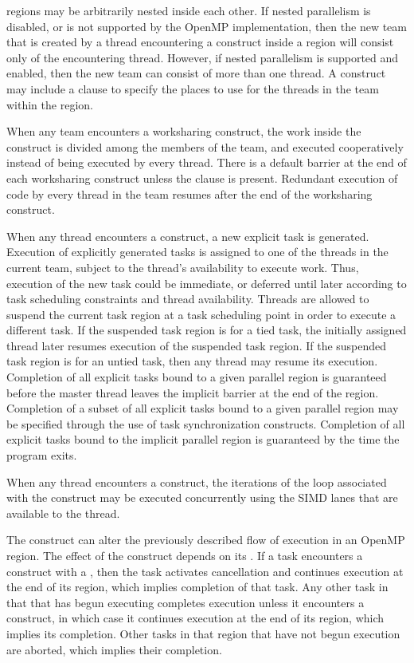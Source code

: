  regions may be arbitrarily nested inside each other. If nested parallelism is
disabled, or is not supported by the OpenMP implementation, then the new team that is 
created by a thread encountering a  construct inside a  region
will consist only of the encountering thread. However, if nested parallelism is supported 
and enabled, then the new team can consist of more than one thread. A 
construct may include a  clause to specify the places to use for the threads
in the team within the  region.

When any team encounters a worksharing construct, the work inside the construct is 
divided among the members of the team, and executed cooperatively instead of being 
executed by every thread. There is a default barrier at the end of each worksharing 
construct unless the  clause is present. Redundant execution of code by every
thread in the team resumes after the end of the worksharing construct.

When any thread encounters a  construct, a new explicit task is generated.
Execution of explicitly generated tasks is assigned to one of the threads in the current 
team, subject to the thread's availability to execute work. Thus, execution of the new 
task could be immediate, or deferred until later according to task scheduling constraints 
and thread availability. Threads are allowed to suspend the current task region at a task 
scheduling point in order to execute a different task. If the suspended task region is for
a tied task, the initially assigned thread later resumes execution of the suspended task
region. If the suspended task region is for an untied task, then any thread may resume its
execution. Completion of all explicit tasks bound to a given parallel region is guaranteed
before the master thread leaves the implicit barrier at the end of the region. Completion
of a subset of all explicit tasks bound to a given parallel region may be specified through
the use of task synchronization constructs. Completion of all explicit tasks bound to the
implicit parallel region is guaranteed by the time the program exits.

When any thread encounters a  construct, the iterations of the loop associated with
the construct may be executed concurrently using the SIMD lanes that are available to
the thread.

The  construct can alter the previously described flow of execution in an
OpenMP region. The effect of the  construct depends on its 
. If a task encounters a  
construct with a  
, then the task activates cancellation 
and continues execution at the end of its
 region, which implies completion of that task. 
Any other task in that 
that has begun executing completes execution unless it encounters a 
 construct, in which case it continues execution at the end of its  region,
which implies its completion. Other tasks in that  region that have not
begun execution are aborted, which implies their completion.


